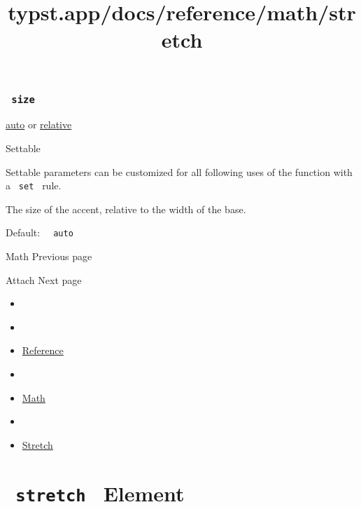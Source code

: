 \subsubsection{\texorpdfstring{\texttt{\ size\ }}{ size }}\label{parameters-size}

\href{/docs/reference/foundations/auto/}{auto} {or}
\href{/docs/reference/layout/relative/}{relative}

{{ Settable }}

\label{parameters-size-settable-tooltip}
Settable parameters can be customized for all following uses of the
function with a \texttt{\ set\ } rule.

The size of the accent, relative to the width of the base.

Default: \texttt{\ }{\texttt{\ auto\ }}\texttt{\ }

\href{/docs/reference/math/}{\pandocbounded{}}

{ Math } { Previous page }

\href{/docs/reference/math/attach/}{\pandocbounded{}}

{ Attach } { Next page }


\title{typst.app/docs/reference/math/stretch}

\begin{itemize}
\tightlist
\item
  \href{/docs}{}
\item
  
\item
  \href{/docs/reference/}{Reference}
\item
  
\item
  \href{/docs/reference/math/}{Math}
\item
  
\item
  \href{/docs/reference/math/stretch/}{Stretch}
\end{itemize}

\section{\texorpdfstring{\texttt{\ stretch\ } {{ Element
}}}{ stretch   Element }}\label{summary}

